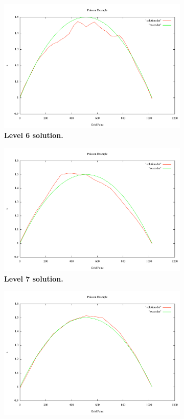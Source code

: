 \documentclass[note]{TechNote}
\begin{document}
\begin{figure}[h!]
\begin{subfigure}[b]{0.32\textwidth}
    \includegraphics[width=\textwidth]{cg_6_level.pdf}
    \caption{\textbf{Level 6 solution.}}
  \end{subfigure}
  \begin{subfigure}[b]{0.32\textwidth}
    \includegraphics[width=\textwidth]{cg_7_level.pdf}
    \caption{\textbf{Level 7 solution.}}
  \end{subfigure}
  \begin{subfigure}[b]{0.32\textwidth}
    \includegraphics[width=\textwidth]{cg_8_level.pdf}

\end{subfigure}
\end{figure}
\end{document}
